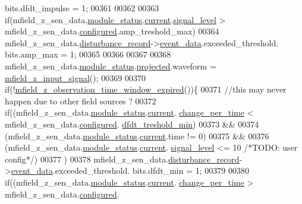 \begin{DoxyCode}
      bits.dfdt\_impulse = 1;
00361 
00362 
00363     \textcolor{keywordflow}{if}(mfield\_z\_sen\_data.\hyperlink{a00027_adfab5a5d8b45a93dfb13edb24e2b80e3}{module\_status}.\hyperlink{a00019_acf41ffc11da291c2f9f0fcb02ee72b98}{current}.\hyperlink{a00019_a4070db8eab0ff93e3fbc1df59872f117}{signal\_level} > 
      mfield\_z\_sen\_data.\hyperlink{a00027_a94b2d1f6ea4ab334c74d24984dd27843}{configured}.amp\_treshold\_max)
00364         mfield\_z\_sen\_data.\hyperlink{a00027_ac9b38e2c1d3f1013a88d33506c754152}{disturbance\_record}->\hyperlink{a00028_a8c0bda69e71ef674e60da47ad0be9ab0}{event\_data}.exceeded\_threshold.
      bits.amp\_max = 1;
00365 
00366 
00367 
00368     mfield\_z\_sen\_data.\hyperlink{a00027_adfab5a5d8b45a93dfb13edb24e2b80e3}{module\_status}.\hyperlink{a00019_af2267fb093fb5dcaa006a570a6da3b6b}{projected}.waveform = 
      \hyperlink{a00053_a30e963041fabe45400803a40cc920b85}{mfield\_z\_input\_signal}();
00369 
00370     \textcolor{keywordflow}{if}(!\hyperlink{a00053_a8d1f1b622ef0081218e8f64cd9a44e59}{mfield\_z\_observation\_time\_window\_expired}())\{
00371         \textcolor{comment}{//this may never happen due to other field sources  ?}
00372        \textcolor{keywordflow}{if}((mfield\_z\_sen\_data.\hyperlink{a00027_adfab5a5d8b45a93dfb13edb24e2b80e3}{module\_status}.\hyperlink{a00019_acf41ffc11da291c2f9f0fcb02ee72b98}{current}.
      \hyperlink{a00019_a0f645dd76b41adc6a966feba8e4bff8c}{change\_per\_time} < mfield\_z\_sen\_data.\hyperlink{a00027_a94b2d1f6ea4ab334c74d24984dd27843}{configured}.
      \hyperlink{a00021_a6f5257920e763b7f5f440bc0515cd963}{dfdt\_treshold\_min})
00373            &&
00374            (mfield\_z\_sen\_data.\hyperlink{a00027_adfab5a5d8b45a93dfb13edb24e2b80e3}{module\_status}.\hyperlink{a00019_acf41ffc11da291c2f9f0fcb02ee72b98}{current}.time != 0)
00375            &&
00376           (mfield\_z\_sen\_data.\hyperlink{a00027_adfab5a5d8b45a93dfb13edb24e2b80e3}{module\_status}.\hyperlink{a00019_acf41ffc11da291c2f9f0fcb02ee72b98}{current}.
      \hyperlink{a00019_a4070db8eab0ff93e3fbc1df59872f117}{signal\_level} <= 10 \textcolor{comment}{/*TODO: user config*/})
00377           )
00378         mfield\_z\_sen\_data.\hyperlink{a00027_ac9b38e2c1d3f1013a88d33506c754152}{disturbance\_record}->\hyperlink{a00028_a8c0bda69e71ef674e60da47ad0be9ab0}{event\_data}.exceeded\_threshold.
      bits.dfdt\_min = 1;
00379 
00380       \textcolor{keywordflow}{if}((mfield\_z\_sen\_data.\hyperlink{a00027_adfab5a5d8b45a93dfb13edb24e2b80e3}{module\_status}.\hyperlink{a00019_acf41ffc11da291c2f9f0fcb02ee72b98}{current}.
      \hyperlink{a00019_a0f645dd76b41adc6a966feba8e4bff8c}{change\_per\_time}  > mfield\_z\_sen\_data.\hyperlink{a00027_a94b2d1f6ea4ab334c74d24984dd27843}{configured}.

\end{DoxyCode}
